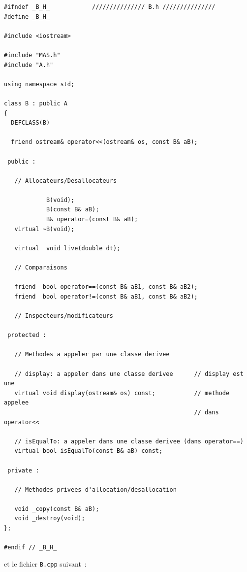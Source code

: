 \documentclass[12pt]{article}
\begin{document}
\begin{footnotesize}
\begin{verbatim}
#ifndef _B_H_            /////////////// B.h ///////////////
#define _B_H_

#include <iostream>

#include "MAS.h"
#include "A.h"

using namespace std;

class B : public A
{
  DEFCLASS(B)

  friend ostream& operator<<(ostream& os, const B& aB);

 public :

   // Allocateurs/Desallocateurs

            B(void);
            B(const B& aB);
            B& operator=(const B& aB);
   virtual ~B(void);

   virtual  void live(double dt);

   // Comparaisons

   friend  bool operator==(const B& aB1, const B& aB2);
   friend  bool operator!=(const B& aB1, const B& aB2);

   // Inspecteurs/modificateurs

 protected :

   // Methodes a appeler par une classe derivee

   // display: a appeler dans une classe derivee      // display est une
   virtual void display(ostream& os) const;           // methode appelee
                                                      // dans operator<<

   // isEqualTo: a appeler dans une classe derivee (dans operator==)
   virtual bool isEqualTo(const B& aB) const;

 private :

   // Methodes privees d'allocation/desallocation

   void _copy(const B& aB);
   void _destroy(void);
};

#endif // _B_H_
\end{verbatim}
\end{footnotesize}

\newpage

et le fichier {\tt B.cpp} suivant~:
\end{document}
